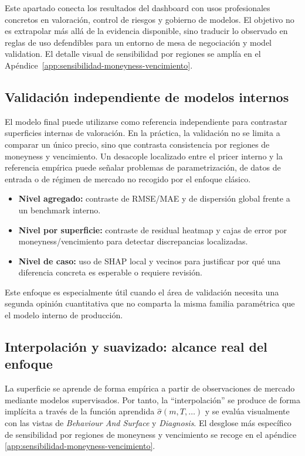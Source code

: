 Este apartado conecta los resultados del dashboard con usos profesionales concretos en valoración, control de riesgos y gobierno de modelos. El objetivo no es extrapolar más allá de la evidencia disponible, sino traducir lo observado en reglas de uso defendibles para un entorno de mesa de negociación y model validation. El detalle visual de sensibilidad por regiones se amplía en el Apéndice~\ref{app:sensibilidad-moneyness-vencimiento}.

\subsection{Validación independiente de modelos internos}
\label{subsec:validacion-independiente}

El modelo final puede utilizarse como referencia independiente para contrastar superficies internas de valoración. En la práctica, la validación no se limita a comparar un único precio, sino que contrasta consistencia por regiones de moneyness y vencimiento. Un desacople localizado entre el pricer interno y la referencia empírica puede señalar problemas de parametrización, de datos de entrada o de régimen de mercado no recogido por el enfoque clásico.

\begin{itemize}
  \item \textbf{Nivel agregado:} contraste de RMSE/MAE y de dispersión global frente a un benchmark interno.
  \item \textbf{Nivel por superficie:} contraste de residual heatmap y cajas de error por moneyness/vencimiento para detectar discrepancias localizadas.
  \item \textbf{Nivel de caso:} uso de SHAP local y vecinos para justificar por qué una diferencia concreta es esperable o requiere revisión.
\end{itemize}

Este enfoque es especialmente útil cuando el área de validación necesita una segunda opinión cuantitativa que no comparta la misma familia paramétrica que el modelo interno de producción.

\subsection{Interpolación y suavizado: alcance real del enfoque}
\label{subsec:interpolacion-suavizado-alcance}

La superficie se aprende de forma empírica a partir de observaciones de mercado mediante modelos supervisados. Por tanto, la ``interpolación'' se produce de forma implícita a través de la función aprendida $\hat{\sigma}(m,T,\dots)$ y se evalúa visualmente con las vistas de \emph{Behaviour And Surface} y \emph{Diagnosis}. El desglose más específico de sensibilidad por regiones de moneyness y vencimiento se recoge en el apéndice \ref{app:sensibilidad-moneyness-vencimiento}.

